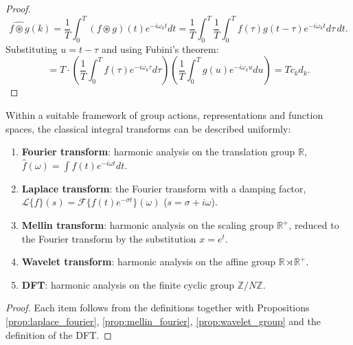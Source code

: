 \begin{proof}
\[
\widehat{f \circledast g}(k) = \frac{1}{T}\int_0^T (f \circledast g)(t) e^{-i\omega_k t} dt
= \frac{1}{T}\int_0^T \frac{1}{T}\int_0^T f(\tau) g(t-\tau) e^{-i\omega_k t} d\tau\, dt.
\]
Substituting $u = t - \tau$ and using Fubini's theorem:
\[
= T \cdot \left(\frac{1}{T}\int_0^T f(\tau) e^{-i\omega_k \tau} d\tau\right)\left(\frac{1}{T}\int_0^T g(u) e^{-i\omega_k u} du\right) = T c_k d_k.
\]
\end{proof}

\begin{theorem}\label{thm:classical_transforms_unified}
Within a suitable framework of group actions, representations and function spaces, the classical integral transforms can be described uniformly:
\begin{enumerate}[label=(\roman*)]
    \item \textbf{Fourier transform}: harmonic analysis on the translation group $\mathbb{R}$, $\hat{f}(\omega) = \int f(t) e^{-i\omega t} dt$.
    \item \textbf{Laplace transform}: the Fourier transform with a damping factor, $\mathcal{L}\{f\}(s) = \mathcal{F}\{f(t)e^{-\sigma t}\}(\omega)$ ($s = \sigma + i\omega$).
    \item \textbf{Mellin transform}: harmonic analysis on the scaling group $\mathbb{R}^+$, reduced to the Fourier transform by the substitution $x = e^t$.
    \item \textbf{Wavelet transform}: harmonic analysis on the affine group $\mathbb{R} \rtimes \mathbb{R}^+$.
    \item \textbf{DFT}: harmonic analysis on the finite cyclic group $\mathbb{Z}/N\mathbb{Z}$.
\end{enumerate}
\end{theorem}

\begin{proof}
Each item follows from the definitions together with Propositions \ref{prop:laplace_fourier}, \ref{prop:mellin_fourier}, \ref{prop:wavelet_group} and the definition of the DFT.
\end{proof}

